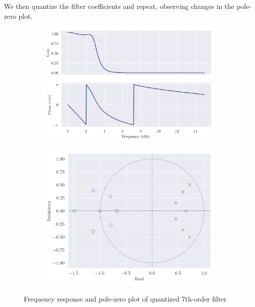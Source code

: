 We then quantize the filter coefficients and repeat, observing changes in the pole-zero plot.

\begin{figure}[!ht]
    \centering
    \begin{subfigure}[b]{0.58\textwidth}
        \centering
        \includegraphics[width=\textwidth]{images/q8_q7th_freqz.png}
    \end{subfigure}
    \hfill
    \begin{subfigure}[b]{0.41\textwidth}
        \centering
        \includegraphics[width=\textwidth]{images/q8_q7th_zp.png}
    \end{subfigure}
    \caption{Frequency response and pole-zero plot of quantized 7th-order filter}
\end{figure}

